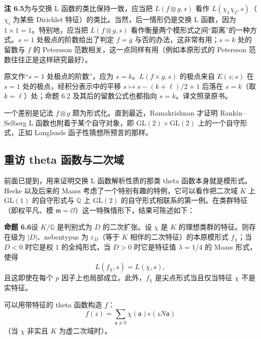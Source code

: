 \par\medskip\noindent\textbf{注 6.5}\quad 为与交换 L 函数的类比保持一致，应当把 $L(f\otimes g,s)$ 看作 $L(\chi_{1}\chi_{2},s)$（$\chi_{i}$ 为某些 Dirichlet 特征）的类比。当然，后一情形仍是交换 L 函数，因为 $1\times1=1$。特别地，应当把 $L(f\otimes g,s)$ 看作衡量两个模形式之间“距离”的一种方式。$s=1$ 处极点的阶数给出了判定 $f=\bar g$ 与否的办法，这非常有用；$s=k$ 处的留数与 $f$ 的 Petersson 范数相关，这一点同样有用（例如本原形式的 Petersson 范数往往正是这样研究最好）。

\begin{annote}
原文作“$s=1$ 处极点的阶数”，应为 $s=k$。$L(f\times g,s)$ 的极点来自 $E(z;s)$ 在 $s=1$ 处的极点，经积分表示中的平移 $s\mapsto s-(k+\ell)/2+1$ 后落在 $s=k$（取 $k=\ell$）处；命题 6.2 及其后的留数公式也都指向 $s=k$。译文照录原书。
\par\vspace{0.15em}{\raggedleft 【来源：原书 §6.2（A）】\par}
\end{annote}

一个差别是记法 $f\otimes g$ 颇为形式化。直到最近，Ramakrishnan 才证明 Rankin--Selberg L 函数也附着于某个自守对象，即 $\mathrm{GL}(2)\times\mathrm{GL}(2)$ 上的一个自守形式，正如 Langlands 函子性猜想所预言的那样。

\subsection{重访 theta 函数与二次域}\label{c3:sec:6.3}

前面已提到，用来证明交换 L 函数解析性质的那类 theta 函数本身就是模形式。Hecke 以及后来的 Maass 考虑了一个特别有趣的特例，它可以看作把二次域 $K$ 上 $\mathrm{GL}(1)$ 的自守形式与 $\mathbb{Q}$ 上 $\mathrm{GL}(2)$ 的自守形式相联系的第一例。在类群特征（即权平凡、模 $\mathfrak{m}=\mathcal{O}$）这一特殊情形下，结果可陈述如下：

\par\medskip\noindent\textbf{命题 6.6}\quad 设 $K/\mathbb{Q}$ 是判别式为 $D$ 的二次扩张。设 $\chi$ 是 $K$ 的理想类群的特征。则存在级为 $|D|$、nebentypus 为 $\varepsilon_{D}$（等于 $K$ 相伴的二次特征）的本原模形式 $f_{\chi}$；当 $D<0$ 时它是权 $1$ 的全纯形式，当 $D>0$ 时它是特征值 $\lambda=1/4$ 的 Maass 形式，使得
\[
L(f_{\chi},s)=L(\chi,s),
\]
且这即使在每个 $p$ 因子上也局部成立。此外，$f_{\chi}$ 是尖点形式当且仅当特征 $\chi$ 不是实特征。

可以用带特征的 theta 函数构造 $f$：
\[
f(z)=\sum_{\mathfrak{a}\ne0}\chi(\mathfrak{a})e(zN\mathfrak{a})
\]
（当 $\chi$ 非实且 $K$ 为虚二次域时）。

